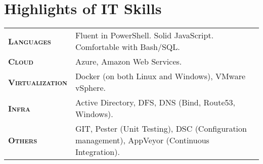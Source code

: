\section{\faCogs\hspace{0.1cm}Highlights of IT Skills}

\begin{tabularx}{\linewidth}{>{\raggedleft\scshape}p{2.5cm}X}
\textbf{Languages} & Fluent in PowerShell. Solid JavaScript. Comfortable with Bash/SQL.\\
\textbf{Cloud} & Azure, Amazon Web Services.\\
\textbf{Virtualization} & Docker (on both Linux and Windows), VMware vSphere.\\
\textbf{Infra} & Active Directory, DFS, DNS (Bind, Route53, Windows).\\
\textbf{Others} & GIT, Pester (Unit Testing), DSC (Configuration management), AppVeyor (Continuous Integration).\\
\end{tabularx}
